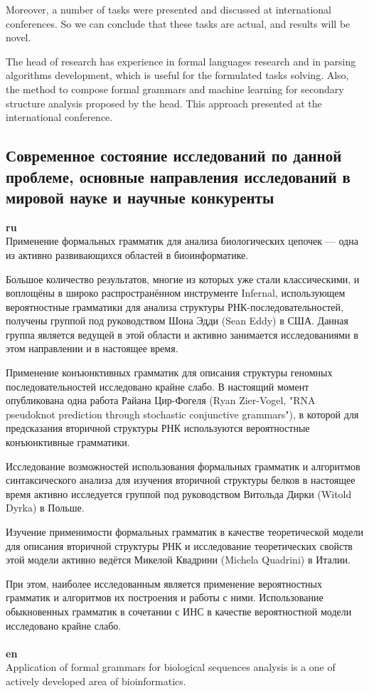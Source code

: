 \documentclass[12pt]{article}  %
\theoremstyle{remark}
\begin{document}
Moreover, a number of tasks were presented and discussed at international conferences.
So we can conclude that these tasks are actual, and results will be novel.

The head of research has experience in formal languages research and in parsing algorithms development, which is useful for the formulated tasks solving.
Also, the method to compose formal grammars and machine learning for secondary structure analysis proposed by the head. This approach presented at the international conference.

\subsection{Современное состояние исследований по данной проблеме, основные направления исследований в мировой науке и научные конкуренты}

\textbf{ru}\\
Применение формальных грамматик для анализа биологических цепочек --- одна из активно развивающихся областей в биоинформатике.

Большое количество результатов, многие из которых уже стали классическими, и воплощёны в широко распространённом инструменте Infernal, использующем вероятностные грамматики для анализа структуры РНК-последовательностей, получены группой под руководством Шона Эдди (Sean Eddy) в США.
Данная группа является ведущей в этой области и активно занимается исследованиями в этом направлении и в настоящее время.

Применение конъюнктивных грамматик для описания структуры геномных последовательностей исследовано крайне слабо.
В настоящий момент опубликована одна работа Райана Цир-Фогеля (Ryan Zier-Vogel, "RNA pseudoknot prediction through stochastic conjunctive grammars"), в которой для предсказания вторичной структуры РНК используются вероятностные конъюнктивные грамматики.

Исследование возможностей использования формальных грамматик и алгоритмов синтаксического анализа для изучения вторичной структуры белков в настоящее время активно исследуется группой под руководством Витольда Дирки (Witold Dyrka) в Польше.

Изучение применимости формальных грамматик в качестве теоретической модели для описания вторичной структуры РНК и исследование теоретических свойств этой модели активно ведётся Микелой Квадрини (Michela Quadrini) в Италии.

При этом, наиболее исследованным является применение вероятностных грамматик и алгоритмов их построения и работы с ними.
Использование обыкновенных грамматик в сочетании с ИНС в качестве вероятностной модели исследовано крайне слабо.
\\
\\
\textbf{en}\\
Application of formal grammars for biological sequences analysis is a one of actively developed area of bioinformatics.
\end{document}

